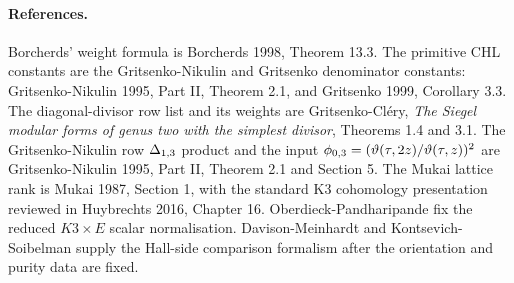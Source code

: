 \paragraph{References.}
Borcherds' weight formula is Borcherds 1998, Theorem 13.3.
The primitive CHL constants are the Gritsenko-Nikulin and Gritsenko
denominator constants: Gritsenko-Nikulin 1995, Part II, Theorem 2.1,
and Gritsenko 1999, Corollary 3.3.  The diagonal-divisor row list and
its weights are Gritsenko-Cl\'ery, \emph{The Siegel modular forms of
genus two with the simplest divisor}, Theorems 1.4 and 3.1.  The
Gritsenko-Nikulin row \(\Delta_{1,3}\) product and the input
\(\phi_{0,3}=(\vartheta(\tau,2z)/\vartheta(\tau,z))^2\) are
Gritsenko-Nikulin 1995, Part II, Theorem 2.1 and Section 5.  The Mukai
lattice rank is Mukai 1987, Section 1, with the standard K3 cohomology
presentation reviewed in Huybrechts 2016, Chapter 16.
Oberdieck-Pandharipande fix the reduced \(K3\times E\) scalar
normalisation.  Davison-Meinhardt and Kontsevich-Soibelman supply the
Hall-side comparison formalism after the orientation and purity data
are fixed.
